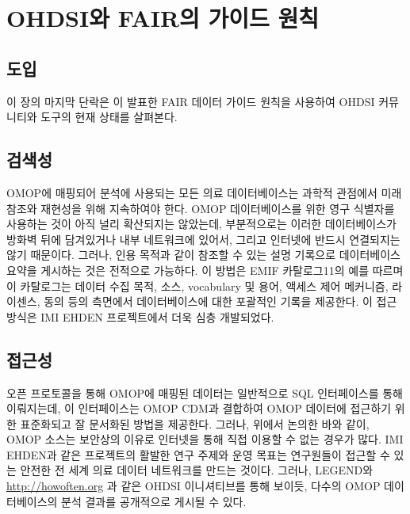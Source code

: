 \documentclass[11pt]{book}
\theoremstyle{definition}
\theoremstyle{definition}
\theoremstyle{definition}
\theoremstyle{remark}
\begin{document}
\section{OHDSI와 FAIR의 가이드 원칙}\label{ohdsi-fair--}


\subsection{도입}

이 장의 마지막 단락은 \citet{wilkinson2016} 이 발표한 FAIR 데이터 가이드
원칙을 사용하여 OHDSI 커뮤니티와 도구의 현재 상태를 살펴본다.

\subsection{\texorpdfstring{검색성\\
}{검색성 }}

OMOP에 매핑되어 분석에 사용되는 모든 의료 데이터베이스는 과학적 관점에서
미래 참조와 재현성을 위해 지속하여야 한다. OMOP 데이터베이스를 위한 영구
식별자를 사용하는 것이 아직 널리 확산되지는 않았는데, 부분적으로는
이러한 데이터베이스가 방화벽 뒤에 담겨있거나 내부 네트워크에 있어서,
그리고 인터넷에 반드시 연결되지는 않기 때문이다. 그러나, 인용 목적과
같이 참조할 수 있는 설명 기록으로 데이터베이스 요약을 게시하는 것은
전적으로 가능하다. 이 방법은 EMIF 카탈로그11의 예를 따르며 이 카탈로그는
데이터 수집 목적, 소스, vocabulary 및 용어, 액세스 제어 메커니즘,
라이센스, 동의 등의 측면에서 데이터베이스에 대한 포괄적인 기록을
제공한다. \citep{Oliveira2019} 이 접근 방식은 IMI EHDEN 프로젝트에서
더욱 심층 개발되었다.

\subsection{접근성}

오픈 프로토콜을 통해 OMOP에 매핑된 데이터는 일반적으로 SQL 인터페이스를
통해 이뤄지는데, 이 인터페이스는 OMOP CDM과 결합하여 OMOP 데이터에
접근하기 위한 표준화되고 잘 문서화된 방법을 제공한다. 그러나, 위에서
논의한 바와 같이, OMOP 소스는 보안상의 이유로 인터넷을 통해 직접 이용할
수 없는 경우가 많다. IMI EHDEN과 같은 프로젝트의 활발한 연구 주제와 운영
목표는 연구원들이 접근할 수 있는 안전한 전 세계 의료 데이터 네트워크를
만드는 것이다. 그러나, LEGEND와 \url{http://howoften.org} 과 같은 OHDSI
이니셔티브를 통해 보이듯, 다수의 OMOP 데이터베이스의 분석 결과를
공개적으로 게시될 수 있다.
\end{document}
